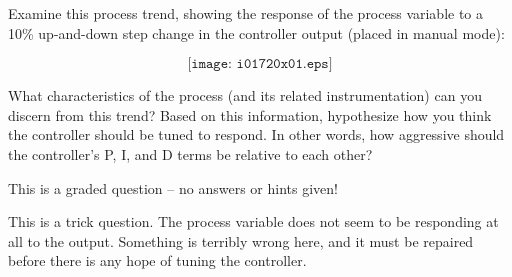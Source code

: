 

Examine this process trend, showing the response of the process variable to a 10\% up-and-down step change in the controller output (placed in manual mode):

$$\texttt{[image: i01720x01.eps]}$$

What characteristics of the process (and its related instrumentation) can you discern from this trend?  Based on this information, hypothesize how you think the controller should be tuned to respond.  In other words, how aggressive should the controller's P, I, and D terms be relative to each other?

\vfil 

\eject






This is a graded question -- no answers or hints given!







This is a trick question.  The process variable does not seem to be responding at all to the output.  Something is terribly wrong here, and it must be repaired before there is any hope of tuning the controller.




